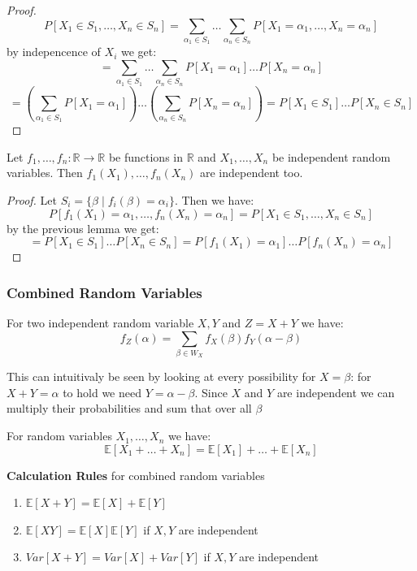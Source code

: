\begin{proof}
    $$P[X_1\in S_1, \dots , X_n\in S_n] = \sum_{\alpha_1 \in S_1} \dots \sum_{\alpha_n \in S_n} P[X_1=\alpha_1, \dots, X_n=\alpha_n]$$
    by indepencence of $X_i$ we get:
    $$= \sum_{\alpha_1 \in S_1} \dots \sum_{\alpha_n \in S_n} P[X_1=\alpha_1] \dots P[X_n=\alpha_n]$$
    $$= (\sum_{\alpha_1 \in S_1} P[X_1=\alpha_1]) \dots (\sum_{\alpha_n \in S_n} P[X_n=\alpha_n]) = P[X_1\in S_1] \dots P[X_n\in S_n]$$
\end{proof}

\begin{theorem}
    Let $f_1, \dots, f_n: \mathbb{R} \to \mathbb{R}$ be functions in $\mathbb{R}$ and $X_1, \dots, X_n$ be independent random variables. Then $f_1(X_1), \dots, f_n(X_n)$ are independent too.
\end{theorem}

\begin{proof}
    Let $S_i = \{\beta \mid f_i(\beta) = \alpha_i\}$. Then we have:
    $$P[f_1(X_1) = \alpha_1, \dots, f_n(X_n) = \alpha_n] = P[X_1 \in S_1, \dots, X_n \in S_n]$$
    by the previous lemma we get:
    $$= P[X_1 \in S_1] \dots P[X_n \in S_n] = P[f_1(X_1) = \alpha_1] \dots P[f_n(X_n) = \alpha_n]$$
\end{proof}
    
\subsubsection{Combined Random Variables}

\begin{theorem}
    For two independent random variable $X, Y$ and $Z = X+Y$ we have:
    $$f_Z(\alpha) = \sum_{\beta \in W_X} f_X(\beta) f_Y(\alpha-\beta)$$
\end{theorem}

\begin{remark}
    This can intuitivaly be seen by looking at every possibility for $X = \beta$: for $X+Y = \alpha$ to hold we need $Y = \alpha - \beta$. Since $X$ and $Y$ are independent we can multiply their probabilities and sum that over all $\beta$
\end{remark}

\begin{theorem}
    For random variables $X_1, \dots , X_n$ we have:
    $$\mathbb{E}[X_1 + \dots + X_n] = \mathbb{E}[X_1] + \dots + \mathbb{E}[X_n]$$
\end{theorem}

\begin{remark}
    \textbf{Calculation Rules} for combined random variables
    \begin{enumerate}
        \item $\mathbb{E}[X+Y] = \mathbb{E}[X] + \mathbb{E}[Y]$
        \item $\mathbb{E}[XY] = \mathbb{E}[X] \mathbb{E}[Y]$ if $X, Y$ are independent
        \item $Var[X+Y] = Var[X] + Var[Y]$ if $X, Y$ are independent
    \end{enumerate}
\end{remark}

